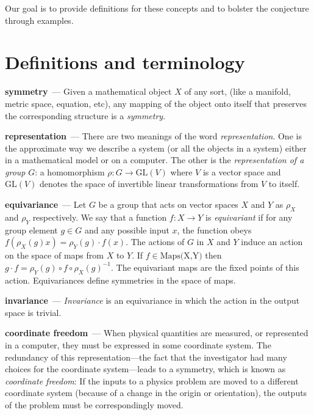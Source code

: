 \documentclass{article}
\renewcommand{\paragraph}[1]{\par\textbf{#1}~---}
\begin{document}
Our goal is to provide definitions for these concepts and to bolster the conjecture through examples.

\section{Definitions and terminology}

\paragraph{symmetry}
Given a mathematical object $X$ of any sort, (like a manifold, metric space, equation, etc), any mapping of the object onto itself that preserves the corresponding structure is a \emph{symmetry}.

\paragraph{representation}
There are two meanings of the word \emph{representation}. One is the approximate way we describe a system (or all the objects in a system) either in a mathematical model or on a computer.
The other is the \emph{representation of a group} $G$: a homomorphism $\rho: G\to \text{GL}(V)$ where $V$ is a vector space and $\text{GL}(V)$ denotes the space of invertible linear transformations from $V$ to itself.

\paragraph{equivariance}
Let $G$ be a group that acts on vector spaces $X$ and $Y$ as $\rho_X$ and $\rho_Y$ respectively. We say that a function $f:X\to Y$ is \emph{equivariant} if for any group element $g\in G$ and any possible input $x$, the function obeys $f( \rho_X(g) x) = \rho_Y(g)\cdot f(x)$.
The actions of $G$ in $X$ and $Y$ induce an action on the space of maps from $X$ to $Y$. If $f\in \text{Maps(X,Y)}$ then $g\cdot f = \rho_Y(g)\circ f \circ \rho_X(g)^{-1}$.
The equivariant maps are the fixed points of this action.
Equivariances define symmetries in the space of maps. 

\paragraph{invariance}
\emph{Invariance} is an equivariance in which the action in the output space is trivial.

\paragraph{coordinate freedom}
When physical quantities are measured, or represented in a computer, they must be expressed in some coordinate system.
The redundancy of this representation---the fact that the investigator had many choices for the coordinate system---leads to a symmetry, which is known as \emph{coordinate freedom}:
If the inputs to a physics problem are moved to a different coordinate system (because of a change in the origin or orientation), the outputs of the problem must be correspondingly moved.
\end{document}
